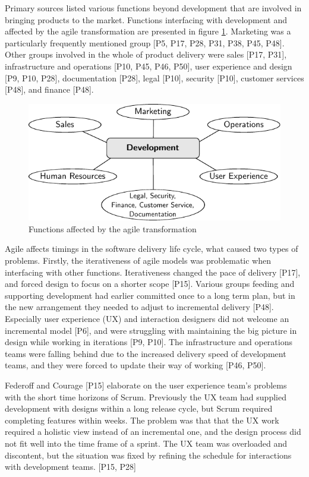 \documentclass[preprint,authoryear,12pt]{elsarticle}
\begin{document}
Primary sources listed various functions beyond development that are involved in
bringing products to the market. Functions interfacing with development and
affected by the agile transformation are presented in figure
\ref{fig:challenges_other_functions}.
Marketing was a particularly frequently mentioned group [P5, P17, P28, P31, P38,
P45, P48]. Other groups involved in the whole of product delivery were sales
[P17, P31], infrastructure and operations [P10, P45, P46, P50], user experience
and design [P9, P10, P28], documentation [P28], legal [P10], security [P10],
customer services [P48], and finance [P48].

\begin{figure}
  \begin{center}
    \includegraphics{graphics/challenges_other_functions.pdf}
    \caption{Functions affected by the agile transformation}
    \label{fig:challenges_other_functions}
  \end{center}
\end{figure}

Agile affects timings in the software delivery life cycle, what caused two types
of problems. Firstly, the iterativeness of agile models was problematic when
interfacing with other functions. Iterativeness changed the pace of delivery
[P17], and forced design to focus on a shorter scope [P15]. Various groups
feeding and supporting development had earlier committed once to a long term
plan, but in the new arrangement they needed to adjust to incremental delivery
[P48].
Especially user experience (UX) and interaction designers did not welcome an
incremental model [P6], and were struggling with maintaining the big picture in
design while working in iterations [P9, P10].
The infrastructure and operations teams were falling behind due to the increased
delivery speed of development teams, and they were forced to update their way of
working [P46, P50].

Federoff and Courage [P15] elaborate on the user experience team's problems
with the short time horizons of Scrum. Previously the UX team had supplied
development with designs within a long release cycle, but Scrum required
completing features within weeks. The problem was that that the UX work required
a holistic view instead of an incremental one, and the design process did not
fit well into the time frame of a sprint. The UX team was overloaded and
discontent, but the situation was fixed by refining the schedule for interactions
with development teams. [P15, P28]
\end{document}
